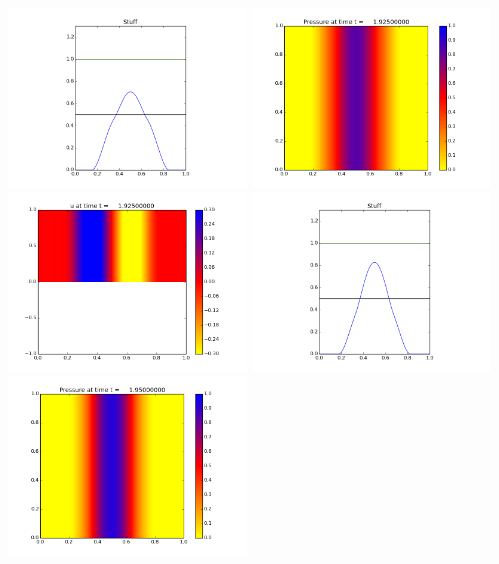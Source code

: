 \documentclass[11pt]{article}
\begin{document}
\vskip 10pt 
\includegraphics[width=0.475\textwidth]{frame0076fig3.png}
\vskip 10pt 
\includegraphics[width=0.475\textwidth]{frame0077fig0.png}
\includegraphics[width=0.475\textwidth]{frame0077fig1.png}
\vskip 10pt 
\includegraphics[width=0.475\textwidth]{frame0077fig3.png}
\vskip 10pt 
\includegraphics[width=0.475\textwidth]{frame0078fig0.png}
\end{document}
